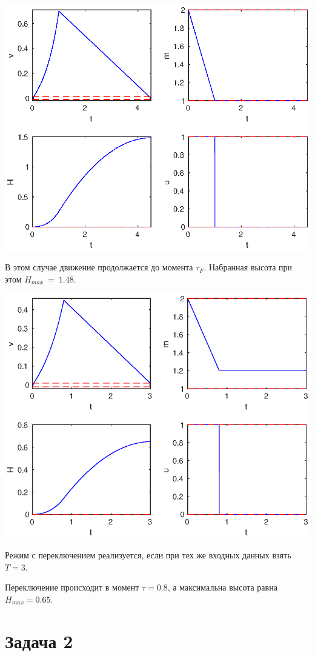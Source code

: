 \documentclass[16pt]{article}
\begin{document}
\includegraphics[width=160mm]{p1_max.eps}

В этом случае движение продолжается до момента $\tau_F$. Набранная высота при этом $H_{max}~=~1.48$.

\includegraphics[width=160mm]{p1_sw.eps}

Режим с переключением реализуется, если при тех же входных данных взять $T = 3$.

Переключение происходит в момент $\tau = 0.8$, а максимальна высота равна $H_{max} = 0.65$.
\newpage
\section{Задача 2}
\end{document}

